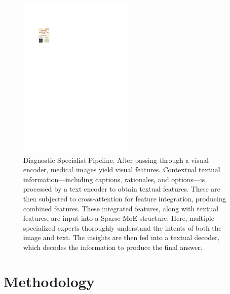 \documentclass[11pt]{article}
\begin{document}
\begin{figure}[t]
\centering
\includegraphics[width=0.5\textwidth]{image/Figure_3_v7.pdf}
\caption{Diagnostic Specialist Pipeline. After passing through a visual encoder, medical images yield visual features. Contextual textual information—including captions, rationales, and options—is processed by a text encoder to obtain textual features. These are then subjected to cross-attention for feature integration, producing combined features. These integrated features, along with textual features, are input into a Sparse MoE structure. Here, multiple specialized experts thoroughly understand the intents of both the image and text. The insights are then fed into a textual decoder, which decodes the information to produce the final answer.
} 
\label{Diagnostic}
\vspace{-1em}
\end{figure}
\section{Methodology}
\end{document}
